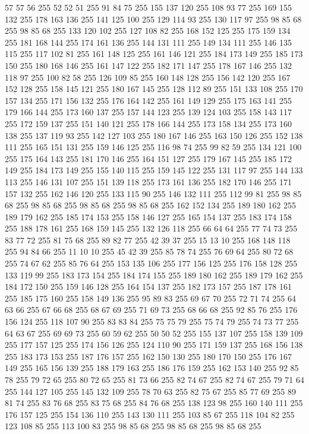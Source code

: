 57 57 56 255 52 52 51 255 91 84 75 255 155 137 120 255 108 93 77 255 169 155 132 255 178 163 136 255 141 125 100 255 129 114 93 255 130 117 97 255 98 85 68 255 98 85 68 255 133 120 102 255 127 108 82 255 168 152 125 255 175 159 134 255 181 168 144 255 174 161 136 255 144 131 111 255 149 134 111 255 146 135 115 255 117 102 81 255 161 148 125 255 161 146 121 255 184 173 149 255 185 173 150 255 180 168 146 255 161 147 122 255 182 171 147 255 178 167 146 255 132 118 97 255 100 82 58 255 126 109 85 255 160 148 128 255 156 142 120 255 167 152 128 255 158 145 121 255 180 167 145 255 128 112 89 255 151 133 108 255 170 157 134 255 171 156 132 255 176 164 142 255 161 149 129 255 175 163 141 255 179 166 144 255 173 160 137 255 157 144 123 255 139 124 103 255 158 143 117 255 172 159 137 255 151 140 121 255 178 166 144 255 173 158 134 255 173 160 138 255 137 119 93 255 142 127 103 255 180 167 146 255 163 150 126 255 152 138 111 255 165 151 131 255 159 146 125 255 116 98 74 255 99 82 59 255
134 121 100 255 175 164 143 255 181 170 146 255 164 151 127 255 179 167 145 255 185 172 149 255 184 173 149 255 155 140 115 255 159 145 122 255 131 117 97 255 144 133 113 255 146 131 107 255 151 139 118 255 173 161 136 255 182 170 146 255 171 157 132 255 162 146 120 255 133 115 90 255 146 132 111 255 112 99 81 255 98 85 68 255 98 85 68 255 98 85 68 255 98 85 68 255 162 152 134 255 189 180 162 255 189 179 162 255 185 174 153 255 158 146 127 255 165 154 137 255 183 174 158 255 188 178 161 255 168 159 145 255 132 126 118 255 66 64 64 255 77 74 73 255 83 77 72 255 81 75 68 255 89 82 77 255 42 39 37 255 15 13 10 255 168 148 118 255 94 84 66 255 11 10 10 255 45 42 39 255 85 78 74 255 76 69 64 255 80 72 68 255 74 67 62 255 85 76 64 255 153 135 106 255 177 156 125 255 176 158 128 255 133 119 99 255 183 173 154 255 184 174 155 255 189 180 162 255 189 179 162 255 184 172 150 255 159 146 128 255 164 154 137 255 182 173 157 255 187 178 161 255 185 175 160 255
158 149 136 255 95 89 83 255 69 67 70 255 72 71 74 255 64 63 66 255 67 66 68 255 68 67 69 255 71 69 73 255 68 66 68 255 92 85 76 255 176 156 124 255 118 107 90 255 83 83 84 255 75 75 79 255 75 74 79 255 74 73 77 255 64 63 67 255 69 69 73 255 60 59 62 255 50 50 52 255 155 137 107 255 158 139 109 255 177 157 125 255 174 156 126 255 124 110 90 255 171 159 137 255 168 156 138 255 183 173 153 255 187 176 157 255 162 150 130 255 180 170 150 255 176 167 149 255 165 156 139 255 188 179 163 255 186 176 159 255 162 153 140 255 92 85 78 255 79 72 65 255 80 72 65 255 81 73 66 255 82 74 67 255 82 74 67 255 79 71 64 255 144 127 105 255 145 132 109 255 78 70 63 255 82 75 67 255 85 77 69 255 89 81 74 255 83 76 68 255 83 75 68 255 84 76 68 255 138 123 98 255 160 140 111 255 176 157 125 255 154 136 110 255 143 130 111 255 103 85 67 255 118 104 82 255 123 108 85 255 113 100 83 255 98 85 68 255 98 85 68 255 98 85 68 255
